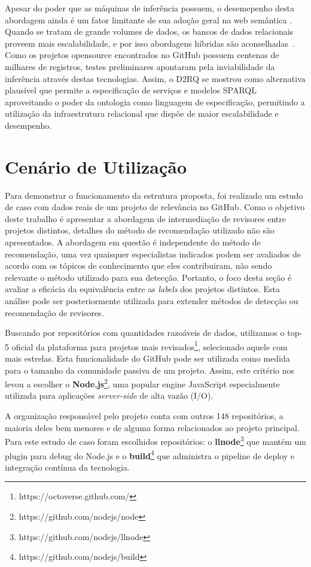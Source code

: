 \documentclass[sigconf]{acmart}
\begin{document}
Apesar do poder que as máquinas de inferência possuem, o desemepenho desta abordagem ainda é um fator limitante de sua adoção geral na web semântica \cite{shvaiko2013}. Quando se tratam de grande volumes de dados, os bancos de dados relacionais proveem mais escalabilidade, e por isso abordagens híbridas são aconselhadas~\cite{hepp2008}. Como os projetos opensource encontrados no GitHub possuem centenas de milhares de registros, testes preliminares apontaram pela inviabilidade da inferência através destas tecnologias. Assim, o D2RQ se mostrou como alternativa plausível que permite a especificação de serviços e modelos SPARQL aproveitando o poder da ontologia como linguagem de especificação, permitindo a utilização da infraestrutura relacional que dispõe de maior escalabilidade e desempenho.


\section{Cenário de Utilização}

Para demonstrar o funcionamento da estrutura proposta, foi realizado um estudo de caso com dados reais de um projeto de relevância no GitHub. Como o objetivo deste trabalho é apresentar a abordagem de intermediação de revisores entre projetos distintos, detalhes do método de recomendação utilizado não são apresentados. A abordagem em questão é independente do método de recomendação, uma vez quaisquer especialistas indicados podem ser avaliados de acordo com os tópicos de conhecimento que eles contribuiram, não sendo relevante o método utilizado para sua detecção. Portanto, o foco desta seção é avaliar a eficácia da equivalência entre as \textit{labels} dos projetos distintos. Esta análise pode ser posteriormente utilizada para extender métodos de detecção ou recomendação de revisores.

Buscando por repositórios com quantidades razoáveis de dados, utilizamos o top-5 oficial da plataforma para projetos mais revisados\footnote{https://octoverse.github.com/}, selecionado aquele com mais estrelas. Esta funcionalidade do GitHub pode ser utilizada como medida para o tamanho da comunidade passiva de um projeto\cite{sheoran2014}. Assim, este critério nos levou a escolher o \textbf{Node.js}\footnote{https://github.com/nodejs/node}, uma popular engine JavaScript especialmente utilizada para aplicações \textit{server-side} de alta vazão (I/O).

A organização responsável pelo projeto conta com outros 148 repositórios, a maioria deles bem menores e de alguma forma relacionados ao projeto principal. Para este estudo de caso foram escolhidos repositórios: o \textbf{llnode}\footnote{https://github.com/nodejs/llnode} que mantém um plugin para debug do Node.js e o \textbf{build}\footnote{https://github.com/nodejs/build} que administra o pipeline de deploy e integração contínua da tecnologia.
\end{document}

